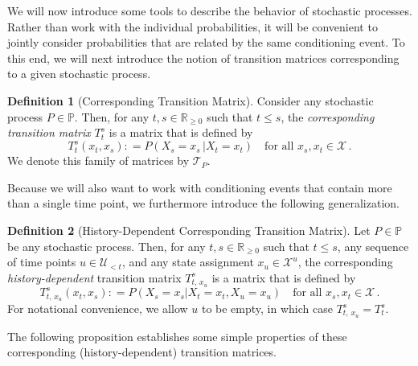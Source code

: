 \documentclass[10pt,a4paper]{paper}
\theoremstyle{definition}
\newtheorem{definition}{Definition}
\newcommand{\reals}{\mathbb{R}}
\newcommand{\realsnonneg}{\reals_{\geq 0}}
\newcommand{\states}{\mathcal{X}}
\newcommand{\processes}{\mathbb{P}}
\newcommand{\coloneqq}{:\!=}
\begin{document}
We will now introduce some tools to describe the behavior of stochastic processes. Rather than work with the individual probabilities, it will be convenient to jointly consider probabilities that are related by the same conditioning event. To this end, we will next introduce the notion of transition matrices corresponding to a given stochastic process.

\begin{definition}[Corresponding Transition Matrix]\label{def:trans_matrix}
Consider any stochastic process $P\in\processes$. Then, for any $t,s\in\realsnonneg$ such that $t\leq s$, the \emph{corresponding transition matrix} $T_t^s$ is a matrix that is defined by
\begin{equation*}
T_t^s(x_t, x_s) \coloneqq P(X_s=x_s\,\vert X_t=x_t)\quad\text{for all $x_s,x_t\in\states$}\,.
\end{equation*}
We denote this family of matrices by $\mathcal{T}_P$.%
\end{definition}

Because we will also want to work with conditioning events that contain more than a single time point, we furthermore introduce the following generalization.

\begin{definition}[History-Dependent Corresponding Transition Matrix]
Let $P\in\processes$ be any stochastic process. Then, for any $t,s\in\realsnonneg$ such that $t\leq s$, any sequence of time points $u\in\mathcal{U}_{<t}$, and any state assignment $x_u\in\states^u$, the corresponding \emph{history-dependent} transition matrix $T_{t,\,x_u}^s$ is a matrix that is defined by
\begin{equation*}
T^s_{t,\,x_u}(x_t,x_s)
\coloneqq
P(X_s=x_s\vert X_t=x_t, X_u=x_u)\quad\text{for all $x_s,x_t\in\states$}\,.
\end{equation*}
For notational convenience, we allow $u$ to be empty, in which case $T_{t,\,x_u}^s=T_t^s$.
\end{definition}

The following proposition establishes some simple properties of these corresponding (history-dependent) transition matrices.
\end{document}
